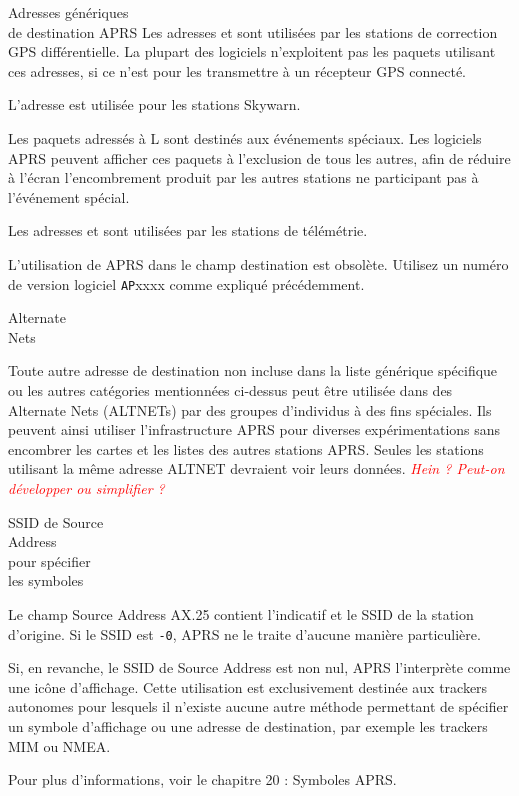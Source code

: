 \begin{aprssideblock}{Adresses génériques\\de destination APRS}
Les adresses  et  sont utilisées par les stations
de correction GPS différentielle. La plupart des logiciels
n'exploitent pas les paquets utilisant ces adresses, si ce n'est pour
les transmettre à un récepteur GPS connecté.

L'adresse  est utilisée pour les stations Skywarn.

Les paquets adressés à {\ttfamily {}L} sont destinés aux
événements spéciaux. Les logiciels APRS peuvent afficher ces paquets à
l'exclusion de tous les autres, afin de réduire à l'écran
l'encombrement produit par les autres stations ne participant pas à
l'événement spécial.

Les adresses  et  sont utilisées par les stations de
télémétrie.

L'utilisation de \guillemotleft{}APRS\guillemotright{} dans le champ
destination est obsolète. Utilisez un numéro de version logiciel
\texttt{AP}xxxx comme expliqué précédemment.
\end{aprssideblock}

\begin{aprssideblock}{Alternate\\Nets}
\label{alternate-nets}
Toute autre adresse de destination non incluse dans la liste générique
spécifique ou les autres catégories mentionnées ci-dessus peut être
utilisée dans des Alternate Nets (ALTNETs) par des groupes d'individus à
des fins spéciales. Ils peuvent ainsi utiliser l'infrastructure APRS
pour diverses expérimentations sans encombrer les cartes et les listes
des autres stations APRS. Seules les stations utilisant la même adresse
ALTNET devraient voir leurs données.
\emph{\textcolor{red}{Hein ? Peut-on développer ou simplifier ?}}
\end{aprssideblock}

\begin{aprssideblock}{SSID de Source\\Address\\pour spécifier\\les symboles}
\label{ssid-de-source-address-pour-spuxe9cifier-des-symboles}
Le champ Source Address AX.25 contient l'indicatif et le SSID de la
station d'origine. Si le SSID est \texttt{-0}, APRS ne le traite
d'aucune manière particulière.

Si, en revanche, le SSID de Source Address est non nul, APRS
l'interprète comme une icône d'affichage. Cette utilisation est
exclusivement destinée aux trackers autonomes pour lesquels il n'existe
aucune autre méthode permettant de spécifier un symbole d'affichage ou
une adresse de destination, par exemple les trackers MIM ou NMEA.

Pour plus d'informations, voir le chapitre 20 : Symboles APRS.
\end{aprssideblock}
